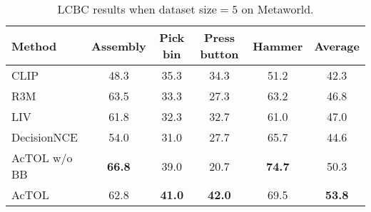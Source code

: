 \begin{table*}[t]
    \centering
    \caption{LCBC results when dataset size$=25$ on Franka Kitchen.}
    \label{tab:franka_25}
    
\end{table*}

\begin{table*}[t]
    \centering
    \caption{LCBC results when dataset size$=5$ on Metaworld.}
    \label{tab:metaworld_5}
    \begin{tabular}{lccccc}
        \toprule
        Method & Assembly & Pick bin & Press button & Hammer & Average \\
        \hline
        CLIP & 48.3 & 35.3 & 34.3 & 51.2 & 42.3 \\
        R3M & 63.5 & 33.3 & 27.3 & 63.2 & 46.8 \\
        LIV & 61.8 & 32.3 & 32.7 & 61.0 & 47.0 \\
        DecisionNCE & 54.0 & 31.0 & 27.7 & 65.7 & 44.6 \\
        AcTOL w/o BB & \cellcolor{lightgray}\textbf{66.8} & 39.0 & 20.7 & \cellcolor{lightgray}\textbf{74.7} & 50.3 \\
        AcTOL & 62.8 & \cellcolor{lightgray}\textbf{41.0} & \cellcolor{lightgray}\textbf{42.0} & 69.5 & \cellcolor{lightgray}\textbf{53.8} \\
        \bottomrule
    \end{tabular}
\end{table*}

